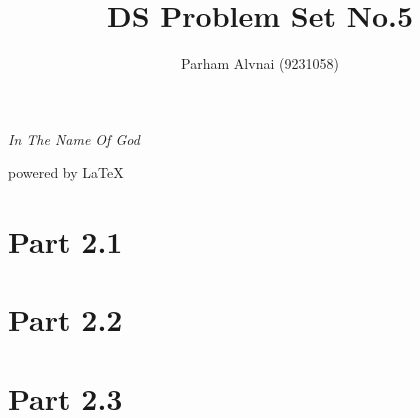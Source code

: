 \documentclass{article}
\author{Parham Alvnai (9231058)}
\title{DS Problem Set No.5}
\begin{document}
\begin{titlepage}
\begin{center}
\emph{In The Name Of God}
\end{center}
\maketitle
\begin{center}
powered by \LaTeX
\end{center}
\end{titlepage}
\tableofcontents
\newpage
\section{Part 2.1}
\section{Part 2.2}
\section{Part 2.3}
\end{document}
